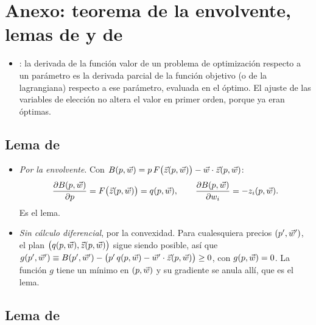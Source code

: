 \documentclass[11pt]{article}
\begin{document}
\section{Anexo: teorema de la envolvente,\cortetitulo{} lemas de  y de }\label{anexo:envolvente}

\begin{itemize}
\item {}: la derivada de la función valor de un problema de optimización respecto a un parámetro es la derivada parcial de la función objetivo (o de la lagrangiana) respecto a ese parámetro, evaluada en el óptimo. El ajuste de las variables de elección no altera el valor en primer orden, porque ya eran óptimas.
\end{itemize}

\subsection{Lema de }\label{anexo:lema-hotelling}

\begin{itemize}
\item \emph{Por la envolvente}. Con $B(p,\vec{w})=p\,F\big(\vec{z}(p,\vec{w})\big)-\vec{w}\cdot\vec{z}(p,\vec{w})$:
  \begin{equation*}
  \frac{\partial B(p,\vec{w})}{\partial p}=F\big(\vec{z}(p,\vec{w})\big)=q(p,\vec{w}),\qquad\frac{\partial B(p,\vec{w})}{\partial w_i}=-z_i(p,\vec{w}).
  \end{equation*}
  Es el lema.\findemo
\item \emph{Sin cálculo diferencial}, por la convexidad. Para cualesquiera precios $(p',\vec{w}')$, el plan $\big(q(p,\vec{w}),\vec{z}(p,\vec{w})\big)$ sigue siendo posible, así que $g(p',\vec{w}')\equiv B(p',\vec{w}')-\big(p'\,q(p,\vec{w})-\vec{w}'\cdot\vec{z}(p,\vec{w})\big)\geq 0$, con $g(p,\vec{w})=0$. La función $g$ tiene un mínimo en $(p,\vec{w})$ y su gradiente se anula allí, que es el lema\nocite{MasColellWhinstonGreen1995}.\findemo
\end{itemize}

\subsection{Lema de }\label{anexo:lema-shephard}
\end{document}
